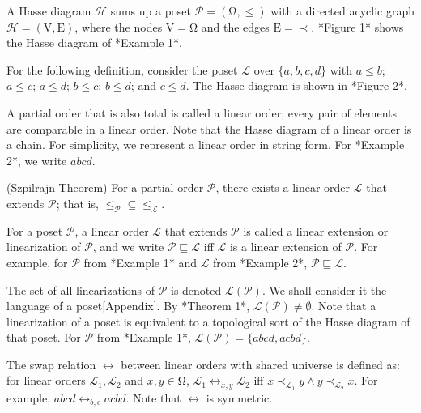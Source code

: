 \documentclass{llncs}
\begin{document}
A Hasse diagram $\mathcal{H}$ sums up a poset $\mathcal{P} = (\mathrm{\Omega}, \leq)$ with a directed acyclic graph $\mathcal{H} = (\mathrm{V},\mathrm{E})$, where the nodes $\mathrm{V} = \mathrm{\Omega}$ and the edges $\mathrm{E} = \prec$. *Figure 1* shows the Hasse diagram of *Example 1*.

\begin{example}
    For the following definition, consider the poset $\mathcal{L}$ over $\{a,b,c,d\}$ with $a \leq b$; $a \leq c$; $a \leq d$; $b \leq c$; $b \leq d$; and $c \leq d$. The Hasse diagram is shown in *Figure 2*.
\end{example}

A partial order that is also total is called a linear order; every pair of elements are comparable in a linear order. Note that the Hasse diagram of a linear order is a chain. For simplicity, we represent a linear order in string form. For *Example 2*, we write $abcd$.

\begin{theorem}
    (Szpilrajn Theorem) For a partial order $\mathcal{P}$, there exists a linear order $\mathcal{L}$ that extends $\mathcal{P}$; that is, $\leq_{\mathcal{P}} \subseteq \leq_{\mathcal{L}}$.
\end{theorem}

For a poset $\mathcal{P}$, a linear order $\mathcal{L}$ that extends $\mathcal{P}$ is called a linear extension or linearization of $\mathcal{P}$, and we write $\mathcal{P} \sqsubseteq \mathcal{L}$ iff $\mathcal{L}$ is a linear extension of $\mathcal{P}$. For example, for $\mathcal{P}$ from *Example 1* and $\mathcal{L}$ from *Example 2*, $\mathcal{P} \sqsubseteq \mathcal{L}$.

The set of all linearizations of $\mathcal{P}$ is denoted $\mathcal{L}(\mathcal{P})$. We shall consider it the language of a poset[Appendix]. By *Theorem 1*, $\mathcal{L}(\mathcal{P}) \neq \emptyset$. Note that a linearization of a poset is equivalent to a topological sort of the Hasse diagram of that poset. For $\mathcal{P}$ from *Example 1*, $\mathcal{L}(\mathcal{P}) = \{abcd, acbd\}$.

The swap relation $\leftrightarrow$ between linear orders with shared universe is defined as: for linear orders $\mathcal{L}_{1}, \mathcal{L}_{2}$ and $x, y \in \mathrm{\Omega}$, $\mathcal{L}_{1} \leftrightarrow_{x, y} \mathcal{L}_{2}$ iff $x \prec_{\mathcal{L}_{1}} y \wedge y \prec_{\mathcal{L}_{2}} x$. For example, $abcd \leftrightarrow_{b, c} acbd$. Note that $\leftrightarrow$ is symmetric.
\end{document}
